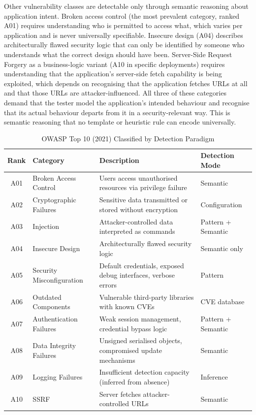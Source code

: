 \documentclass[12pt,a4paper,oneside,openany]{book}
\begin{document}
Other vulnerability classes are detectable only through semantic reasoning about application intent. Broken access control (the most prevalent category, ranked A01) requires understanding who is permitted to access what, which varies per application and is never universally specifiable. Insecure design (A04) describes architecturally flawed security logic that can only be identified by someone who understands what the correct design should have been. Server-Side Request Forgery as a business-logic variant (A10 in specific deployments) requires understanding that the application's server-side fetch capability is being exploited, which depends on recognising that the application fetches URLs at all and that those URLs are attacker-influenced. All three of these categories demand that the tester model the application's intended behaviour and recognise that its actual behaviour departs from it in a security-relevant way. This is semantic reasoning that no template or heuristic rule can encode universally.

\begin{table}[H]
\centering
\caption{OWASP Top 10 (2021) Classified by Detection Paradigm}
\label{tab:owasp}
\begin{tabularx}{\textwidth}{@{}clXl@{}}
\toprule
\textbf{Rank} & \textbf{Category} & \textbf{Description} & \textbf{Detection Mode} \\
\midrule
A01 & Broken Access Control     & Users access unauthorised resources via privilege failure      & Semantic       \\
A02 & Cryptographic Failures    & Sensitive data transmitted or stored without encryption       & Configuration  \\
A03 & Injection                 & Attacker-controlled data interpreted as commands              & Pattern + Semantic \\
A04 & Insecure Design           & Architecturally flawed security logic                        & Semantic only  \\
A05 & Security Misconfiguration & Default credentials, exposed debug interfaces, verbose errors & Pattern        \\
A06 & Outdated Components       & Vulnerable third-party libraries with known CVEs             & CVE database   \\
A07 & Authentication Failures   & Weak session management, credential bypass logic             & Pattern + Semantic \\
A08 & Data Integrity Failures   & Unsigned serialised objects, compromised update mechanisms   & Semantic       \\
A09 & Logging Failures          & Insufficient detection capacity (inferred from absence)      & Inference      \\
A10 & SSRF                      & Server fetches attacker-controlled URLs                      & Semantic       \\
\bottomrule
\end{tabularx}
\end{table}
\end{document}
